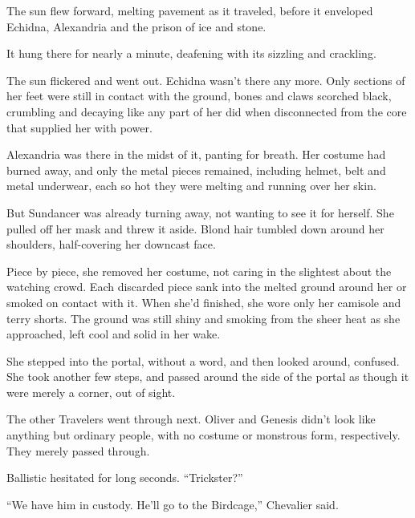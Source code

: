 The sun flew forward, melting pavement as it traveled, before it enveloped Echidna, Alexandria and the prison of ice and stone.



It hung there for nearly a minute, deafening with its sizzling and crackling.



The sun flickered and went out. Echidna wasn't there any more.  Only sections of her feet were still in contact with the ground, bones and claws scorched black, crumbling and decaying like any part of her did when disconnected from the core that supplied her with power.



Alexandria was there in the midst of it, panting for breath.  Her costume had burned away, and only the metal pieces remained, including helmet, belt and metal underwear, each so hot they were melting and running over her skin.



But Sundancer was already turning away, not wanting to see it for herself.  She pulled off her mask and threw it aside.  Blond hair tumbled down around her shoulders, half-covering her downcast face.



Piece by piece, she removed her costume, not caring in the slightest about the watching crowd.  Each discarded piece sank into the melted ground around her or smoked on contact with it.  When she'd finished, she wore only her camisole and terry shorts.  The ground was still shiny and smoking from the sheer heat as she approached, left cool and solid in her wake.



She stepped into the portal, without a word, and then looked around, confused.  She took another few steps, and passed around the side of the portal as though it were merely a corner, out of sight.



The other Travelers went through next.  Oliver and Genesis didn't look like anything but ordinary people, with no costume or monstrous form, respectively.  They merely passed through.



Ballistic hesitated for long seconds.  ``Trickster?''



``We have him in custody.  He'll go to the Birdcage,'' Chevalier said.



